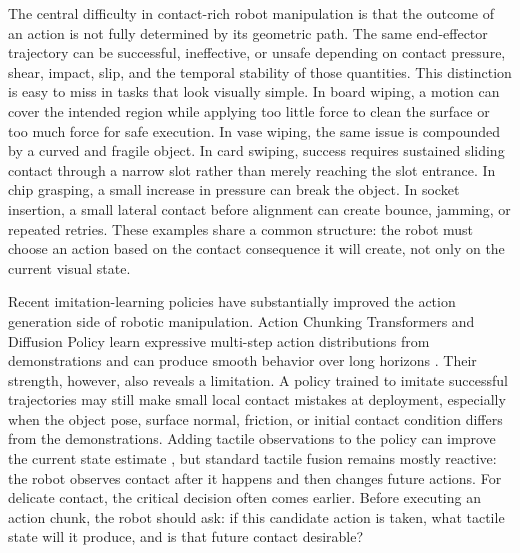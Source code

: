 \documentclass[letterpaper, 10 pt, conference]{ieeeconf}
\begin{document}
The central difficulty in contact-rich robot manipulation is that the outcome of
an action is not fully determined by its geometric path. The same end-effector
trajectory can be successful, ineffective, or unsafe depending on contact
pressure, shear, impact, slip, and the temporal stability of those quantities.
This distinction is easy to miss in tasks that look visually simple. In board
wiping, a motion can cover the intended region while applying too little force
to clean the surface or too much force for safe execution. In vase wiping, the
same issue is compounded by a curved and fragile object. In card swiping,
success requires sustained sliding contact through a narrow slot rather than
merely reaching the slot entrance. In chip grasping, a small increase in
pressure can break the object. In socket insertion, a small lateral contact
before alignment can create bounce, jamming, or repeated retries. These
examples share a common structure: the robot must choose an action based on the
contact consequence it will create, not only on the current visual state.

Recent imitation-learning policies have substantially improved the action
generation side of robotic manipulation. Action Chunking Transformers and
Diffusion Policy learn expressive multi-step action distributions from
demonstrations and can produce smooth behavior over long horizons
\cite{zhao2023act,chi2023diffusion}. Their strength, however, also reveals a
limitation. A policy trained to imitate successful trajectories may still make
small local contact mistakes at deployment, especially when the object pose,
surface normal, friction, or initial contact condition differs from the
demonstrations. Adding tactile observations to the policy can improve the
current state estimate \cite{calandra2018more,lee2019making,li2022see}, but
standard tactile fusion remains mostly reactive: the robot observes contact
after it happens and then changes future actions. For delicate contact, the
critical decision often comes earlier. Before executing an action chunk, the
robot should ask: if this candidate action is taken, what tactile state will it
produce, and is that future contact desirable?
\end{document}
